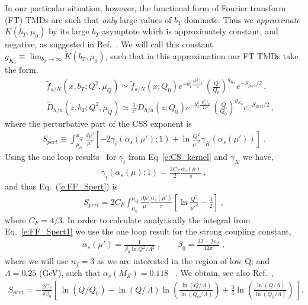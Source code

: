 \documentclass[final,3p,times,onecolumn,sort&compress,hidelinks]{elsarticle}
\begin{document}
In our particular situation, however, the functional form of Fourier transform (FT) TMDs    are such that {\em only} large values of $b_T$  dominate.  
Thus we {\em approximate} $K(b_T,\mu_0)$ by its large $b_T$ asymptote which is approximately  constant, and  negative,
  as suggested in Ref.~\cite{Collins:2014jpa}.
  We will call this constant $g_{K_{0}}\equiv \lim_{b_T\to \infty} \tilde K(b_T,\mu_0)$, such that in this approximation our FT TMDs take the form,
\begin{eqnarray}
&&\tilde f_{a/N} (x,b_T; Q^2, \mu_Q)\simeq \tilde f_{a/N} (x; Q_0) e^{-b_T^2 \frac{\langle k_\perp^2 \rangle_a}{4}}\,\left( \frac{Q}{Q_0}\right)^{g_{K_0}} e^{-S_{pert}/2}\,,
\nonumber \\[0.3cm]
&&\tilde D_{h/a}(z,b_T; Q^2, \mu_Q)\simeq \frac{1}{z^2} D_{h/a}(z; Q_0) e^{-b_T^2 \frac{\langle p_\perp^2 \rangle_a}{4 z^2}}\,\left( \frac{Q}{Q_0}\right)^{g_{K_0}}e^{-S_{pert}/2}\,,
\label{e:FF_ansatz1}
\end{eqnarray}
where the  perturbative part of the CSS exponent is
\begin{eqnarray}
S_{pert} \equiv \int_{\mu_0}^{\mu_Q} \frac{d \mu'}{\mu'}\left[
-2 \gamma_i(\alpha_s(\mu');1) +\ln\frac{Q^2}{\mu'^2}\gamma_K(\alpha_s(\mu'))
 \right] \; .
 \label{e:FF_Spert}
\end{eqnarray}
 Using the  one loop results~\cite{Aybat:2011zv} for $\gamma_i$ from Eq~\eqref{e:CS_kernel} and $\gamma_K$  we have,
\begin{eqnarray}
  \gamma_i(\alpha_s(\mu);1) = \frac{3 C_F}{2}  \frac{\alpha_s(\mu)}{\pi}  \ ,
  \end{eqnarray}
and thus Eq.~(\ref{e:FF_Spert}) is
\begin{eqnarray}
S_{pert} = 2 C_F \int_{\mu_0}^{\mu_Q} \frac{d \mu'}{\mu'} \frac{\alpha_s(\mu')}{\pi} \left[\ln\frac{Q^2}{\mu'^2} - \frac{3}{2}
 \right] \; ,
 \label{e:FF_Spert1}
\end{eqnarray}
where $C_F = 4/3$. In order to calculate analytically the integral from Eq.~\eqref{e:FF_Spert1} we   use the one loop result for the strong coupling constant, 
\begin{eqnarray}
\alpha_s(\mu') = \frac{1}{\beta_0 \ln Q^2/\Lambda^2} \; , \quad\quad
\beta_0 = \frac{33-2 n_f}{12 \pi}\; ,
 \label{e:as}
\end{eqnarray}
where we will use $n_f=3$ as we are interested in the region of low Q; and $\Lambda = 0.25$ (GeV), such that $\alpha_s(M_Z)= 0.118$ ~\cite{Bethke:2012jm}. We obtain, see also Ref.~\cite{Aidala:2014hva},
\begin{eqnarray}
    S_{pert} = -\frac{2 C_F}{\pi \beta_0}\left[\, \ln\left(Q/Q_0\right)
  - \ln\left(Q/\, \Lambda\right) \ln\left(\frac{\ln\left(Q/\,\Lambda\right)}
  {\ln\left(Q_0/\, \Lambda\right)}\right) +
\frac{3}{4} \ln \left(\frac{\ln\left(Q/\Lambda\right)}{\ln\left(Q_0/\Lambda\right)} \right)\, \right].
 \label{e:FF_Spert_analytical}
\end{eqnarray}
\end{document}
